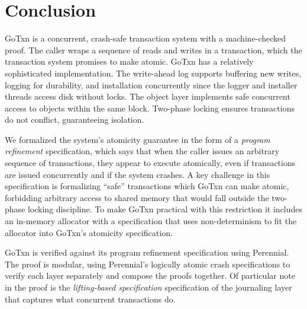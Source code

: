 \section{Conclusion}
\label{sec:gotxn:concl}

GoTxn is a concurrent, crash-safe transaction system with a machine-checked
proof. The caller wraps a sequence of reads and writes in a transaction, which
the transaction system promises to make atomic. GoTxn has a relatively
sophisticated implementation. The write-ahead log supports buffering new writes,
logging for durability, and installation concurrently since the logger and
installer threads access disk without locks. The object layer implements
safe concurrent access to objects within the same block. Two-phase locking
ensures transactions do not conflict, guaranteeing isolation.

We formalized the system's atomicity guarantee in the form of a \emph{program
refinement} specification, which says that when the caller issues an arbitrary
sequence of transactions, they appear to execute atomically, even if
transactions are issued concurrently and if the system crashes. A key challenge
in this specification is formalizing ``safe'' transactions which GoTxn can make
atomic, forbidding arbitrary access to shared memory that would fall outside the
two-phase locking discipline. To make GoTxn practical with this restriction it
includes an in-memory allocator with a specification that uses non-determinism
to fit the allocator into GoTxn's atomicity specification.

GoTxn is verified against its program refinement specification using Perennial.
The proof is modular, using Perennial's logically atomic crash specifications to
verify each layer separately and compose the proofs together. Of particular note
in the proof is the \emph{lifting-based specification} specification of the
journaling layer that captures what concurrent transactions do.
